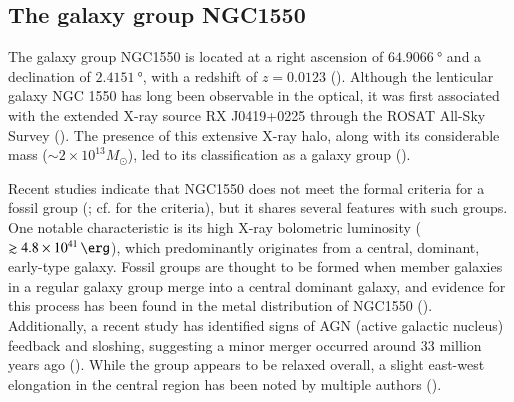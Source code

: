 \subsection{The galaxy group NGC1550}\label{sec:ngc1550}
The galaxy group NGC1550 is located at a right ascension of \(\SI{64.9066}{\degree}\) and a declination of \(\SI{2.4151}{\degree}\), with a redshift of \(z = 0.0123\) (\cite{Reiprich_2002}). Although the lenticular galaxy NGC 1550 has long been observable in the optical, it was first associated with the extended X-ray source RX J0419+0225 through the ROSAT All-Sky Survey (\cite{Bohringer_2000}). The presence of this extensive X-ray halo, along with its considerable mass (\(\sim 2 \times 10^{13} M_{\odot}\)), led to its classification as a galaxy group (\cite{Kawaharada_2003}).

Recent studies indicate that NGC1550 does not meet the formal criteria for a fossil group (\cite{Sun_2003}; cf. \cite{Jones2003} for the criteria), but it shares several features with such groups. One notable characteristic is its high X-ray bolometric luminosity (\(\gtrsim \SI{4.8e41}{\erg}\)), which predominantly originates from a central, dominant, early-type galaxy. Fossil groups are thought to be formed when member galaxies in a regular galaxy group merge into a central dominant galaxy, and evidence for this process has been found in the metal distribution of NGC1550 (\cite{Kawaharada_2009, Sato_2010}). Additionally, a recent study has identified signs of AGN (active galactic nucleus) feedback and sloshing, suggesting a minor merger occurred around 33 million years ago (\cite{Kolokythas_2020}). While the group appears to be relaxed overall, a slight east-west elongation in the central region has been noted by multiple authors (\cite{Kolokythas_2020, Sun_2003}).
%
